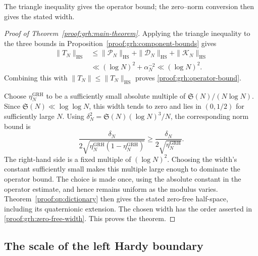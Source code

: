 \documentclass[12pt,a4paper]{amsart}
\numberwithin{equation}{section}
\def\le{\leqslant}
\def\ge{\geqslant}
\theoremstyle{plain}
\theoremstyle{definition}
\theoremstyle{remark}
\begin{document}
The triangle inequality gives the operator bound; the zero--norm
conversion then gives the stated width.

\begin{proof}[Proof of Theorem~\ref{proof:grh:main-theorem}]
Applying the triangle inequality to the three bounds in
Proposition~\ref{proof:grh:component-bounds} gives
\[
 \begin{aligned}
 \|T_N\|_{\mathrm{HS}}
 &\le\|\mathcal P_N\|_{\mathrm{HS}}
      +\|\mathcal D_N\|_{\mathrm{HS}}
      +\|\mathcal K_N\|_{\mathrm{HS}}\\
 &\ll (\log N)^2+\alpha_N^{-2}\ll (\log N)^2.
 \end{aligned}
\]
Combining this with $\|T_N\|\le\|T_N\|_{\mathrm{HS}}$ proves
\eqref{proof:grh:operator-bound}.

Choose $\eta_N^{\mathrm{GRH}}$ to be a sufficiently small
absolute multiple of
$\mathfrak S(N)/(N\log N)$. Since $\mathfrak S(N)\ll\log\log N$, this width
tends to zero and lies in $(0,1/2)$ for sufficiently large $N$.
Using $\delta_N^2=\mathfrak S(N)(\log N)^3/N$, the corresponding
norm bound is
\[
 \frac{\delta_N}
      {2\sqrt{\eta_N^{\mathrm{GRH}}(1-\eta_N^{\mathrm{GRH}})}}
 \ge\frac{\delta_N}{2\sqrt{\eta_N^{\mathrm{GRH}}}}.
\]
The right-hand side is a fixed multiple of $(\log N)^2$.
Choosing the width's constant sufficiently small makes this multiple
large enough to dominate the operator bound.
The choice is made once, using the absolute constant in the operator
estimate, and hence remains uniform as the modulus varies.
Theorem~\ref{proof:qp:dictionary} then gives the stated zero-free half-space,
including its quaternionic extension. The chosen width has the
order asserted in \eqref{proof:grh:zero-free-width}.
This proves the theorem.
\end{proof}

\subsection{The scale of the left Hardy boundary}
\end{document}
